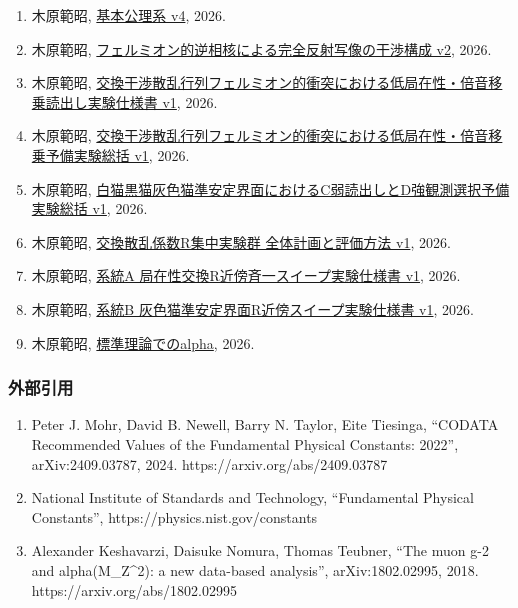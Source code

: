 \documentclass[
]{article}
\providecommand{\tightlist}{%
  \setlength{\itemsep}{0pt}\setlength{\parskip}{0pt}}
\begin{document}
\begin{enumerate}
\def\labelenumi{\arabic{enumi}.}
\tightlist
\item
  木原範昭, \href{../20260710/基本公理系\%20v4.md}{基本公理系 v4}, 2026.
\item
  木原範昭,
  \href{../20260710/フェルミオン的逆相核による完全反射写像の干渉構成\%20v2.md}{フェルミオン的逆相核による完全反射写像の干渉構成
  v2}, 2026.
\item
  木原範昭,
  \href{../20260713/交換干渉散乱行列フェルミオン的衝突における低局在性・倍音移乗読出し実験仕様書\%20v1.md}{交換干渉散乱行列フェルミオン的衝突における低局在性・倍音移乗読出し実験仕様書
  v1}, 2026.
\item
  木原範昭,
  \href{../20260713/交換干渉散乱行列フェルミオン的衝突における低局在性・倍音移乗予備実験総括\%20v1.md}{交換干渉散乱行列フェルミオン的衝突における低局在性・倍音移乗予備実験総括
  v1}, 2026.
\item
  木原範昭,
  \href{../20260714/白猫黒猫灰色猫準安定界面におけるC弱読出しとD強観測選択予備実験総括\%20v1.md}{白猫黒猫灰色猫準安定界面におけるC弱読出しとD強観測選択予備実験総括
  v1}, 2026.
\item
  木原範昭,
  \href{交換散乱係数R集中実験群_全体計画と評価方法_v1.md}{交換散乱係数R集中実験群
  全体計画と評価方法 v1}, 2026.
\item
  木原範昭,
  \href{系統A_局在性交換R近傍斉一スイープ実験仕様書_v1.md}{系統A
  局在性交換R近傍斉一スイープ実験仕様書 v1}, 2026.
\item
  木原範昭,
  \href{系統B_灰色猫準安定界面R近傍スイープ実験仕様書_v1.md}{系統B
  灰色猫準安定界面R近傍スイープ実験仕様書 v1}, 2026.
\item
  木原範昭, \href{標準理論でのα.md}{標準理論でのalpha}, 2026.
\end{enumerate}

\subsubsection{外部引用}\label{ux5916ux90e8ux5f15ux7528}

\begin{enumerate}
\def\labelenumi{\arabic{enumi}.}
\setcounter{enumi}{9}
\tightlist
\item
  Peter J. Mohr, David B. Newell, Barry N. Taylor, Eite Tiesinga,
  ``CODATA Recommended Values of the Fundamental Physical Constants:
  2022'', arXiv:2409.03787, 2024. https://arxiv.org/abs/2409.03787
\item
  National Institute of Standards and Technology, ``Fundamental Physical
  Constants'', https://physics.nist.gov/constants
\item
  Alexander Keshavarzi, Daisuke Nomura, Thomas Teubner, ``The muon g-2
  and alpha(M\_Z\^{}2): a new data-based analysis'', arXiv:1802.02995,
  2018. https://arxiv.org/abs/1802.02995
\end{enumerate}
\end{document}
